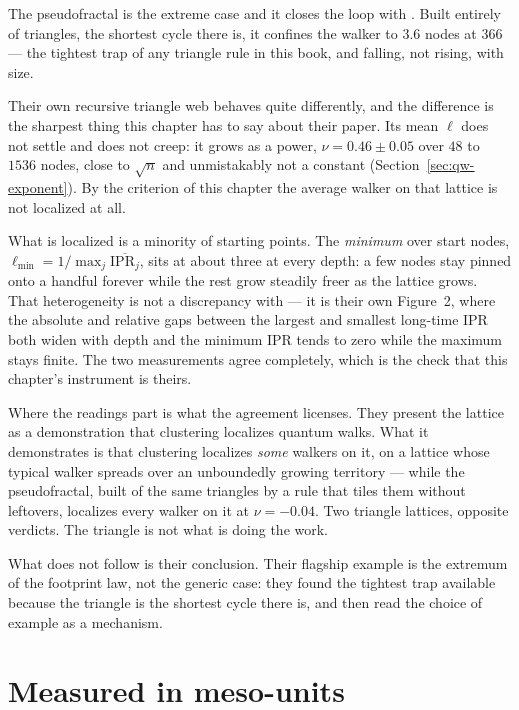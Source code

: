 The pseudofractal is the extreme case and it closes the loop with
\citet{boettcher2025localization}. Built entirely of triangles, the shortest cycle
there is, it confines the walker to $3.6$ nodes at $366$ --- the tightest trap of any
triangle rule in this book, and falling, not rising, with size.

Their own recursive triangle web behaves quite differently, and the difference is the
sharpest thing this chapter has to say about their paper. Its mean $\ell$ does not
settle and does not creep: it grows as a power, $\nu=0.46\pm0.05$ over $48$ to $1536$
nodes, close to $\sqrt{n}$ and unmistakably not a constant
(Section~\ref{sec:qw-exponent}). By the criterion of this chapter the average walker
on that lattice is not localized at all.

What is localized is a minority of starting points. The \emph{minimum} over start
nodes, $\ell_{\min}=1/\max_j\overline{\mathrm{IPR}_j}$, sits at about three at every
depth: a few nodes stay pinned onto a handful forever while the rest grow steadily
freer as the lattice grows. That heterogeneity is not a discrepancy with
\citet{boettcher2025localization} --- it is their own Figure~2, where the absolute and
relative gaps between the largest and smallest long-time IPR both widen with depth and
the minimum IPR tends to zero while the maximum stays finite. The two measurements
agree completely, which is the check that this chapter's instrument is theirs.

Where the readings part is what the agreement licenses. They present the lattice as a
demonstration that clustering localizes quantum walks. What it demonstrates is that
clustering localizes \emph{some} walkers on it, on a lattice whose typical walker
spreads over an unboundedly growing territory --- while the pseudofractal, built of the
same triangles by a rule that tiles them without leftovers, localizes every walker on
it at $\nu=-0.04$. Two triangle lattices, opposite verdicts. The triangle is not what
is doing the work.

What does not follow is their conclusion. Their flagship example is the extremum of
the footprint law, not the generic case: they found the tightest trap available
because the triangle is the shortest cycle there is, and then read the choice of
example as a mechanism.

\section{Measured in meso-units}
\label{sec:qw-meso}

